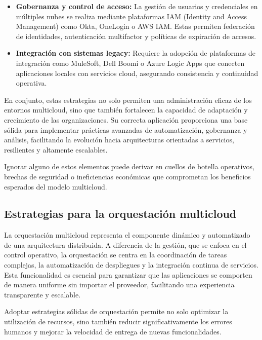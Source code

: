 {\begin{itemize}
                \item \textbf{Gobernanza y control de acceso:} La gestión de usuarios y credenciales en múltiples nubes se realiza mediante plataformas IAM (Identity and Access Management) como Okta, OneLogin o AWS IAM. Estas permiten federación de identidades, autenticación multifactor y políticas de expiración de accesos.
                
                \item \textbf{Integración con sistemas legacy:} Requiere la adopción de plataformas de integración como MuleSoft, Dell Boomi o Azure Logic Apps que conecten aplicaciones locales con servicios cloud, asegurando consistencia y continuidad operativa.
            \end{itemize}
            
            En conjunto, estas estrategias no solo permiten una administración eficaz de los entornos multicloud, sino que también fortalecen la capacidad de adaptación y crecimiento de las organizaciones. Su correcta aplicación proporciona una base sólida para implementar prácticas avanzadas de automatización, gobernanza y análisis, facilitando la evolución hacia arquitecturas orientadas a servicios, resilientes y altamente escalables.
            
            Ignorar alguno de estos elementos puede derivar en cuellos de botella operativos, brechas de seguridad o ineficiencias económicas que comprometan los beneficios esperados del modelo multicloud.

        \subsection{Estrategias para la orquestación multicloud}
            La orquestación multicloud representa el componente dinámico y automatizado de una arquitectura distribuida. A diferencia de la gestión, que se enfoca en el control operativo, la orquestación se centra en la coordinación de tareas complejas, la automatización de despliegues y la integración continua de servicios. Esta funcionalidad es esencial para garantizar que las aplicaciones se comporten de manera uniforme sin importar el proveedor, facilitando una experiencia transparente y escalable.
            
            Adoptar estrategias sólidas de orquestación permite no solo optimizar la utilización de recursos, sino también reducir significativamente los errores humanos y mejorar la velocidad de entrega de nuevas funcionalidades.

}
